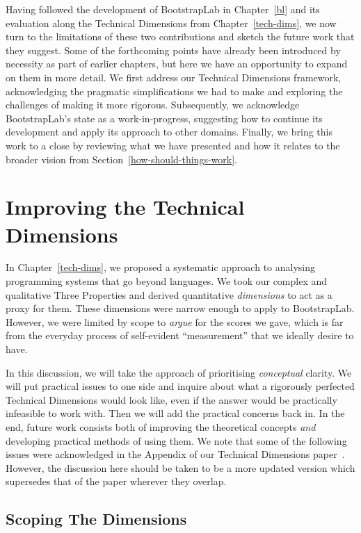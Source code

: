 \documentclass[ twoside,openright,titlepage,numbers=noenddot,headinclude,footinclude,cleardoublepage=empty,abstract=on,
                BCOR=5mm,paper=a4,fontsize=11pt
                ]{scrreprt}
\theoremstyle{definition}
\begin{document}
Having followed the development of BootstrapLab in Chapter~\ref{bl} and
its evaluation along the Technical Dimensions from
Chapter~\ref{tech-dims}, we now turn to the limitations of these two
contributions and sketch the future work that they suggest. Some of the
forthcoming points have already been introduced by necessity as part of
earlier chapters, but here we have an opportunity to expand on them in
more detail. We first address our Technical Dimensions framework,
acknowledging the pragmatic simplifications we had to make and exploring
the challenges of making it more rigorous. Subsequently, we acknowledge
BootstrapLab's state as a work-in-progress, suggesting how to continue
its development and apply its approach to other domains. Finally, we
bring this work to a close by reviewing what we have presented and how
it relates to the broader vision from
Section~\ref{how-should-things-work}.

\hypertarget{improving-the-technical-dimensions}{\section{Improving the Technical
Dimensions}\label{improving-the-technical-dimensions}}

In Chapter~\ref{tech-dims}, we proposed a systematic approach to
analysing programming systems that go beyond languages. We took our
complex and qualitative Three Properties and derived quantitative
\emph{dimensions} to act as a proxy for them. These dimensions were
narrow enough to apply to BootstrapLab. However, we were limited by
scope to \emph{argue} for the scores we gave, which is far from the
everyday process of self-evident ``measurement'' that we ideally desire
to have.

In this discussion, we will take the approach of prioritising
\emph{conceptual} clarity. We will put practical issues to one side and
inquire about what a rigorously perfected Technical Dimensions would
look like, even if the answer would be practically infeasible to work
with. Then we will add the practical concerns back in. In the end,
future work consists both of improving the theoretical concepts
\emph{and} developing practical methods of using them. We note that some
of the following issues were acknowledged in the Appendix of our
Technical Dimensions paper~\parencite{TechDims}. However, the discussion
here should be taken to be a more updated version which supersedes that
of the paper wherever they overlap.

\hypertarget{scoping-the-dimensions}{\subsection{Scoping The Dimensions}\label{scoping-the-dimensions}}
\end{document}
